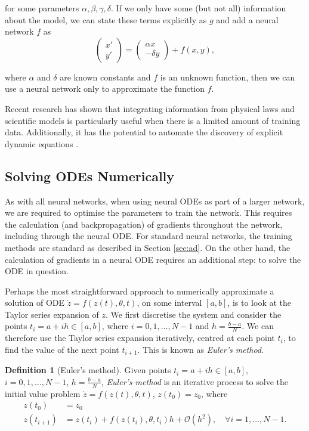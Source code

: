 \documentclass[a4paper,11pt,titlepage]{article}
\theoremstyle{definition}
\newtheorem{definition}{Definition}[section]
\theoremstyle{plain}
\theoremstyle{remark}
\begin{document}
for some parameters $\alpha, \beta, \gamma, \delta$. If we only have some (but not all) information about the model, we can state these terms explicitly as $g$ and add a neural network $f$ as
$$
\begin{pmatrix}x'\\ y'
\end{pmatrix}=\begin{pmatrix}\alpha x\\-\delta y\end{pmatrix}+f(x,y),
$$

where $\alpha$ and $\delta$ are known constants and $f$ is an unknown function, then we can use a neural network only to approximate the function $f$. 

Recent research has shown that integrating information from physical laws and scientific models is particularly useful when there is a limited amount of training data. Additionally, it has the potential to automate the discovery of explicit dynamic equations \cite{rackauckas2020universal}.

\subsection{Solving ODEs Numerically}
\label{sec:rungekutta}

As with all neural networks, when using neural ODEs as part of a larger network, we are required to optimise the parameters to train the network. This requires the calculation (and backpropagation) of gradients throughout the network, including through the neural ODE. For standard neural networks, the training methods are standard as described in Section \ref{sec:ad}. On the other hand, the calculation of gradients in a neural ODE requires an additional step: to solve the ODE in question.

Perhaps the most straightforward approach to numerically approximate a solution of ODE $\dot{z}= f(z(t), \theta,t)$, on some interval $\left[a, b\right]$, is to look at the Taylor series expansion of $z$. We first discretise the system and consider the points $t_i = a + ih \in \left[a, b\right]$, where $i = 0, 1, \dots, N - 1$ and $h = \frac{b-a}{N}$. We can therefore use the Taylor series expansion iteratively, centred at each point $t_i$, to find the value of the next point $t_{i + 1}$. This is known as \textit{Euler's method}.

\begin{definition}[Euler's method]
    Given points $t_i = a + ih \in \left[a, b\right]$, $i = 0, 1, \dots, N - 1$, $h = \frac{b-a}{N}$, \textit{Euler's method} is an iterative process to solve the initial value problem $\dot{z}= f(z(t), \theta,t)$, $z(t_0) = z_0$, where
    \begin{align*}
        z(t_0) &= z_0 \\
        z(t_{i+1}) &= z(t_i) + f(z(t_{i}), \theta, t_i)h + \mathcal{O}(h^2),\quad\forall i = 1, \dots, N - 1.
    \end{align*}
\end{definition}
\end{document}
